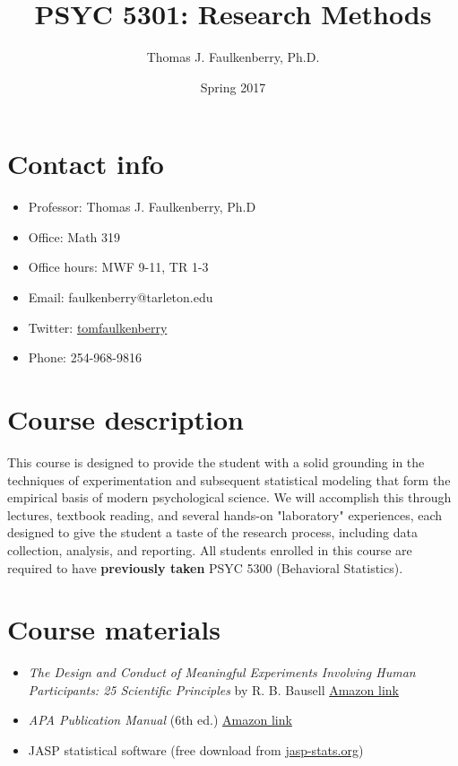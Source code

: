 \documentclass[10pt]{article}
\author{Thomas J. Faulkenberry, Ph.D.}
\date{Spring 2017}
\title{PSYC 5301: Research Methods}
\begin{document}
\maketitle

\section*{Contact info}
\label{sec-1}
\begin{itemize}
\item Professor: Thomas J. Faulkenberry, Ph.D
\item Office: Math 319
\item Office hours: MWF 9-11, TR 1-3
\item Email: faulkenberry@tarleton.edu
\item Twitter: \href{http://twitter.com/tomfaulkenberry}{tomfaulkenberry}
\item Phone: 254-968-9816
\end{itemize}

\section*{Course description}
\label{sec-2}

This course is designed to provide the student with a solid grounding in
the techniques of experimentation and subsequent statistical modeling that
form the empirical basis of modern psychological science.  We will 
accomplish this through lectures, textbook reading, and several hands-on
"laboratory" experiences, each designed to give the student a taste of the
research process, including data collection, analysis, and reporting.
All students enrolled in this course are required to have 
\textbf{previously taken} PSYC 5300 (Behavioral Statistics). 

\section*{Course materials}
\label{sec-3}

\begin{itemize}
\item \emph{The Design and Conduct of Meaningful Experiments Involving Human Participants: 25 Scientific Principles} by R. B. Bausell \href{https://www.amazon.com/Conduct-Meaningful-Experiments-Involving-Participants/dp/0199385238}{Amazon link}
\item \emph{APA Publication Manual} (6th ed.) \href{http://www.amazon.com/Publication-Manual-American-Psychological-Association/dp/1433805618/}{Amazon link}
\item JASP statistical software (free download from \href{http://jasp-stats.org}{jasp-stats.org})
\end{itemize}
\end{document}
